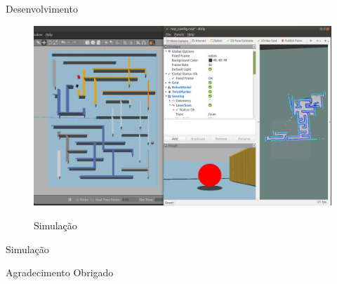 \documentclass{beamer}
\begin{document}
            \begin{frame}{Desenvolvimento}
                \centering
                    \begin{figure}[htb]
                        \centering
                        \includegraphics[scale=0.18]{figuras/simulation.png}                   
                        \label{}
                        \caption{Simulação}
                    \end{figure}                 
            \end{frame} 

            \begin{frame}{Simulação}
                \centering
            \end{frame} 

           
            
            \begin{frame}{Agradecimento}
                \centering Obrigado           
            \end{frame}
\end{document}
